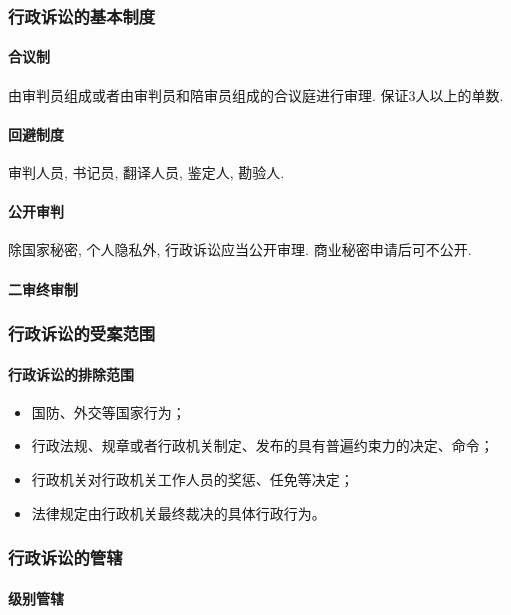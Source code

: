\subsubsection{行政诉讼的基本制度}

\paragraph{合议制} 由审判员组成或者由审判员和陪审员组成的合议庭进行审理. 保证3人以上的单数. 

\paragraph{回避制度} 审判人员, 书记员, 翻译人员, 鉴定人, 勘验人.

\paragraph{公开审判} 除国家秘密, 个人隐私外, 行政诉讼应当公开审理. 商业秘密申请后可不公开.

\paragraph{二审终审制}

\subsubsection{行政诉讼的受案范围}

\paragraph{行政诉讼的排除范围}

\begin{itemize}
    \item 国防、外交等国家行为；
    \item 行政法规、规章或者行政机关制定、发布的具有普遍约束力的决定、命令；
    \item 行政机关对行政机关工作人员的奖惩、任免等决定；
    \item 法律规定由行政机关最终裁决的具体行政行为。
\end{itemize}

\subsubsection{行政诉讼的管辖}

\paragraph{级别管辖}

